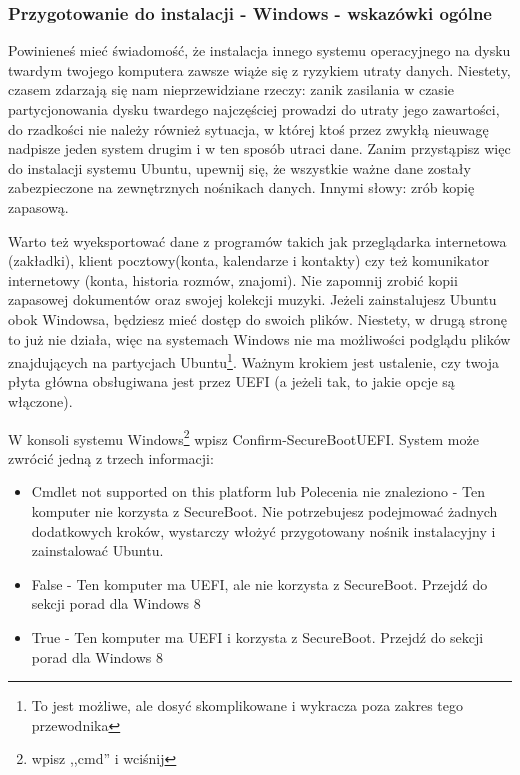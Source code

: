 \subsubsection{Przygotowanie do instalacji - Windows - wskazówki ogólne}
\label{sec:przygotowanie_windows}
Powinieneś mieć świadomość, że instalacja innego systemu operacyjnego na dysku twardym twojego komputera zawsze wiąże się z ryzykiem utraty danych. Niestety, czasem zdarzają się nam nieprzewidziane rzeczy: zanik zasilania w czasie partycjonowania dysku twardego najczęściej prowadzi do utraty jego zawartości, do rzadkości nie należy również sytuacja, w której ktoś przez zwykłą nieuwagę  nadpisze jeden system drugim i w ten sposób utraci dane. Zanim przystąpisz więc do instalacji systemu Ubuntu, upewnij się, że wszystkie ważne dane zostały zabezpieczone na zewnętrznych nośnikach danych. Innymi słowy: zrób kopię zapasową.

Warto też wyeksportować dane z programów takich jak przeglądarka internetowa (zakładki), klient pocztowy(konta, kalendarze i kontakty) czy też komunikator internetowy (konta, historia rozmów, znajomi). Nie zapomnij zrobić kopii zapasowej dokumentów oraz swojej kolekcji muzyki. Jeżeli zainstalujesz Ubuntu obok Windowsa, będziesz mieć dostęp do swoich plików. Niestety, w drugą stronę to już nie działa, więc na systemach Windows nie ma możliwości podglądu plików znajdujących na partycjach Ubuntu\footnote{To jest możliwe, ale dosyć skomplikowane i wykracza poza zakres tego przewodnika}.
Ważnym krokiem jest ustalenie, czy twoja płyta główna obsługiwana jest przez UEFI (a jeżeli tak, to jakie opcje są włączone).

W konsoli systemu Windows\footnote{ wpisz ,,cmd'' i wciśnij \keys{\returnwin} } wpisz \textcolor{ubuntu_orange}{Confirm-SecureBootUEFI}. System może zwrócić jedną z trzech informacji:
\begin{itemize}
\item \textcolor{ubuntu_orange}{Cmdlet not supported on this platform} lub \textcolor{ubuntu_orange}{Polecenia nie znaleziono} - Ten komputer nie korzysta z SecureBoot. Nie potrzebujesz podejmować żadnych dodatkowych kroków, wystarczy włożyć przygotowany nośnik instalacyjny i zainstalować Ubuntu.
\item \textcolor{ubuntu_orange}{False} - Ten komputer ma UEFI, ale nie korzysta z SecureBoot. Przejdź do sekcji porad dla Windows 8
\item \textcolor{ubuntu_orange}{True} - Ten komputer ma UEFI i korzysta z SecureBoot. Przejdź do sekcji porad dla Windows 8
\end{itemize}
